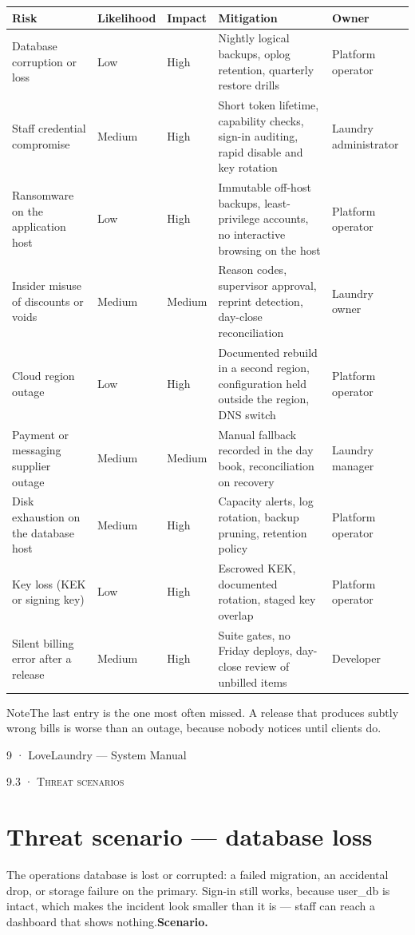 \documentclass[11pt,a4paper,oneside]{book}
\begin{document}
\begin{center}\small
\begin{tabularx}{\linewidth}{|X|X|X|X|X|}
\hline
\rowcolor{lightgrey}
\textbf{Risk} & \textbf{Likelihood} & \textbf{Impact} & \textbf{Mitigation} & \textbf{Owner} \\ \hline
Database corruption or loss & Low & High & Nightly logical backups, oplog retention, quarterly restore drills & Platform operator \\ \hline
Staff credential compromise & Medium & High & Short token lifetime, capability checks, sign-in auditing, rapid disable and key rotation & Laundry administrator \\ \hline
Ransomware on the application host & Low & High & Immutable off-host backups, least-privilege accounts, no interactive browsing on the host & Platform operator \\ \hline
Insider misuse of discounts or voids & Medium & Medium & Reason codes, supervisor approval, reprint detection, day-close reconciliation & Laundry owner \\ \hline
Cloud region outage & Low & High & Documented rebuild in a second region, configuration held outside the region, DNS switch & Platform operator \\ \hline
Payment or messaging supplier outage & Medium & Medium & Manual fallback recorded in the day book, reconciliation on recovery & Laundry manager \\ \hline
Disk exhaustion on the database host & Medium & High & Capacity alerts, log rotation, backup pruning, retention policy & Platform operator \\ \hline
Key loss (KEK or signing key) & Low & High & Escrowed KEK, documented rotation, staged key overlap & Platform operator \\ \hline
Silent billing error after a release & Medium & High & Suite gates, no Friday deploys, day-close review of unbilled items & Developer \\ \hline
\end{tabularx}
\end{center}
\begin{notebox}NoteThe last entry is the one most often missed. A release that produces subtly wrong bills is worse than an outage, because nobody notices until clients do.\end{notebox}
9 · LoveLaundry — System Manual

\textsc{\small\color{crimson}9.3 · Threat scenarios}\par\medskip
\section*{Threat scenario — database loss}
The operations database is lost or corrupted: a failed migration, an accidental drop, or storage failure on the primary. Sign-in still works, because user\_db is intact, which makes the incident look smaller than it is — staff can reach a dashboard that shows nothing.\textbf{Scenario.}
\end{document}
